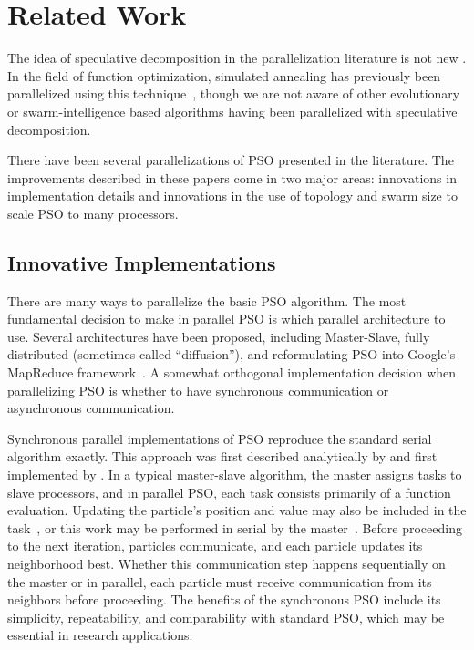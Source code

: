 \documentclass[ms,electronic,twosidetoc,letterpaper,chaptercenter,parttop,equalmargins]{byumsphd}
\begin{document}
\section{Related Work}
\label{sec:related}

The idea of speculative decomposition in the parallelization literature is not
new \citep{grama-2003-intro-to-parallel-computing}.  In the field of function
optimization, simulated annealing has previously been parallelized using this
technique~\citep{witte-1991-parallel-simulated-annealing-speculative}, though
we are not aware of other evolutionary or swarm-intelligence based algorithms
having been parallelized with speculative decomposition.

There have been several parallelizations of PSO presented in the literature.
The improvements described in these papers come in two major areas: innovations
in implementation details and innovations in the use of topology and swarm size
to scale PSO to many processors.

\subsection{Innovative Implementations}

There are many ways to parallelize the basic PSO algorithm.  The most
fundamental decision to make in parallel PSO is which parallel architecture to
use.  Several architectures have been proposed, including Master-Slave, fully
distributed (sometimes called ``diffusion''), and reformulating PSO into
Google's MapReduce framework~\citep{belal-2004-parallel-models-for-pso,
mcnabb-2007-parallel-pso-using-mapreduce}.  A somewhat orthogonal
implementation decision when parallelizing PSO is whether to have synchronous
communication or asynchronous communication.

Synchronous parallel implementations of PSO reproduce the standard serial
algorithm exactly.  This approach was first described analytically by
\citet{belal-2004-parallel-models-for-pso} and first implemented by
\citet{schutte-2004-parallel-global-optimization-with-pso}.  In a typical
master-slave algorithm, the master assigns tasks to slave processors, and in
parallel PSO, each task consists primarily of a function evaluation.  Updating
the particle's position and value may also be included in the
task~\citep{belal-2004-parallel-models-for-pso}, or this work may be performed
in serial by the
master~\citep{schutte-2004-parallel-global-optimization-with-pso}.  Before
proceeding to the next iteration, particles communicate, and each particle
updates its neighborhood best.  Whether this communication step happens
sequentially on the master or in parallel, each particle must receive
communication from its neighbors before proceeding.  The benefits of the
synchronous PSO include its simplicity, repeatability, and comparability with
standard PSO, which may be essential in research applications.
\end{document}
